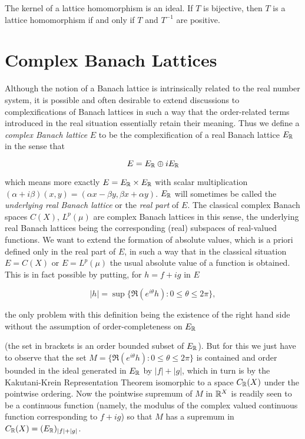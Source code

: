 The kernel of a lattice homomorphism is an ideal.
If $ T $ is bijective, then $ T $ is a lattice homomorphism if and only if $ T $ and $ T^{-1} $ are positive.

\section{Complex Banach Lattices}\label{sec:c1-7}

Although the notion of a Banach lattice is intrinsically related to the real number system, it is possible and often desirable to extend discussions to complexifications of Banach lattices in such a way that the order-related terms introduced in the real situation essentially retain their meaning.
Thus we define a \emph{complex Banach lattice} $ E $ to be the complexification of a real Banach lattice $ E_{\mathbb{R}} $ in the sense that

\[
E = E_{\mathbb{R}} \oplus iE_{\mathbb{R}}
\]

which means more exactly $ E = E_{\mathbb{R}} \times E_{\mathbb{R}} $ with scalar multiplication $ (\alpha+i\beta)(x,y) = (\alpha x-\beta y,\beta x+\alpha y) $.
$ E_{\mathbb{R}} $ will sometimes be called the \emph{underlying real Banach lattice} or the \emph{real part} of $ E $.
The classical complex Banach spaces $ C(X) $, $ L^{p}(\mu) $ are complex Banach lattices in this sense, the underlying real Banach lattices being the corresponding (real) subspaces of real-valued functions.
We want to extend the formation of absolute values, which is a priori defined only in the real part of $ E $, in such a way that in the classical situation $ E = C(X) $ or $ E = L^{p}(\mu) $ the usual absolute value of a function is obtained.
This is in fact possible by putting, for $ h = f + ig $ in $ E $

\[
|h| = \sup\{ \Re(e^{i\theta}h) : 0 \leq \theta \leq 2\pi \},
\]

the only problem with this definition being the existence of the right hand side without the assumption of order-completeness on $ E_{\mathbb{R}} $


\pagebreak

(the set in brackets is an order bounded subset of $ E_{\mathbb{R}} $).
But for this we just have to observe that the set $ M = \{\Re(e^{i\theta}h) : 0 \leq \theta \leq 2\pi\} $ is contained and order bounded in the ideal generated in $ E_{\mathbb{R}} $ by $ |f| + |g| $, which in turn is by the Kakutani-Krein Representation Theorem isomorphic to a space $ C_{\mathbb{R}}(X) $ under the pointwise ordering.
Now the pointwise supremum of $ M $ in $ \mathbb{R}^{X} $ is readily seen to be a continuous function (namely, the modulus of the complex valued continuous function corresponding to $ f + ig $) so that $ M $ has a supremum in $ C_{\mathbb{R}}(X) = (E_{\mathbb{R}})_{|f|+|g|} $.

